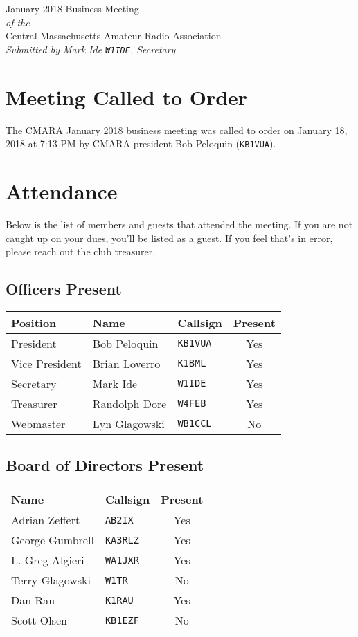 \documentclass[10pt,letterpaper]{article}
\begin{document}
\begin{center}
{\huge January 2018 Business Meeting}\\
\emph{of the}\\
{\Large Central Massachusetts Amateur Radio Association}\\
\emph{Submitted by Mark Ide \texttt{W1IDE}, Secretary}
\end{center}

\section{Meeting Called to Order}
The CMARA January 2018 business meeting was called to order on January 18, 2018 at 7:13 PM by CMARA president Bob Peloquin (\texttt{KB1VUA}).

\section{Attendance}
\noindent
Below is the list of members and guests that attended the meeting. If you are not caught up on your dues, you'll be listed as a guest. If you feel that's in error, please reach out the club treasurer.

\subsection{Officers Present}
\begin{tabular}{|l|l|l|c|}
  \hline
  \textbf{Position} & \textbf{Name}  & \textbf{Callsign} & \textbf{Present} \\ \hline
  President         & Bob Peloquin   & \texttt{KB1VUA}   & Yes  \\
  Vice President    & Brian Loverro  & \texttt{K1BML}    & Yes \\
  Secretary         & Mark Ide       & \texttt{W1IDE}    & Yes \\
  Treasurer         & Randolph Dore  & \texttt{W4FEB}    & Yes \\
  Webmaster         & Lyn Glagowski  & \texttt{WB1CCL}   & No  \\
  \hline
\end{tabular}

\subsection{Board of Directors Present}
\begin{tabular}{|l|l|c|}
  \hline
  \textbf{Name}     & \textbf{Callsign} & \textbf{Present} \\ \hline
  Adrian Zeffert  & \texttt{AB2IX}    &  Yes \\ \hline
  George Gumbrell & \texttt{KA3RLZ}   &  Yes \\ \hline
  L. Greg Algieri & \texttt{WA1JXR}   &  Yes \\ \hline
  Terry Glagowski & \texttt{W1TR}     &  No  \\ \hline
  Dan Rau         & \texttt{K1RAU}    &  Yes \\ \hline
  Scott Olsen     & \texttt{KB1EZF}   &  No  \\ \hline
  \hline
\end{tabular}
\end{document}
